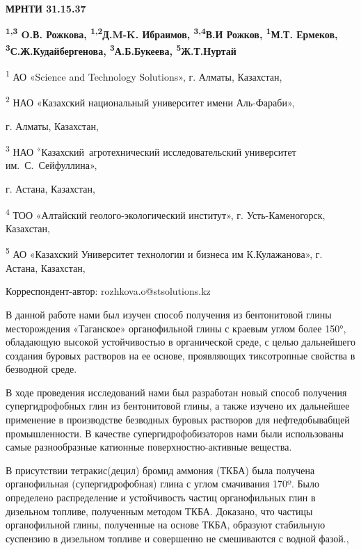 \newpage
{\bfseries МРНТИ 31.15.37}


\begin{center}
{\bfseries \textsuperscript{1,3} O.В. Рожкова, \textsuperscript{1,2}Д.M-K. Ибраимов, \textsuperscript{3,4}В.И Рожков, \textsuperscript{1}М.Т. Ермеков, \textsuperscript{3}С.Ж.Кудайбергенова, \textsuperscript{3}А.Б.Букеева, \textsuperscript{5}Ж.Т.Нуртай}

\textsuperscript{1} АО «Science and Technology Solutions», г. Алматы,
Казахстан,

\textsuperscript{2} НАО «Казахский национальный университет имени
Аль-Фараби»,

г. Алматы, Казахстан,

\textsuperscript{3} НАО \textsuperscript{«}Казахский~агротехнический
исследовательский университет им.~С.~Сейфуллина»,

г. Астана, Казахстан,

\textsuperscript{4} ТОО «Алтайский геолого-экологический институт», г.
Усть-Каменогорск, Казахстан,

\textsuperscript{5} АО «Казахский Университет технологии и бизнеса им
К.Кулажанова», г. Астана, Казахстан,

Корреспондент-автор: rozhkova.o@stsolutions.kz
\end{center}

В данной работе нами был изучен способ получения из бентонитовой глины
месторождения «Таганское» органофильной глины с краевым углом более
150°, обладающую высокой устойчивостью в органической среде, с целью
дальнейшего создания буровых растворов на ее основе, проявляющих
тиксотропные свойства в безводной среде.

В ходе проведения исследований нами был разработан новый способ
получения супергидрофобных глин из бентонитовой глины, а также изучено
их дальнейшее применение в производстве безводных буровых растворов для
нефтедобывабщей промышленности. В качестве супергидрофобизаторов нами
были использованы самые разнообразные катионные поверхностно-активные
вещества.

В присутствии тетракис(децил) бромид аммония (ТКБА) была получена
органофильная (супергидрофобная) глина с углом смачивания 170º. Было
определено распределение и устойчивость частиц органофильных глин в
дизельном топливе, полученным методом ТКБА. Доказано, что частицы
органофильной глины, полученные на основе ТКБА, образуют стабильную
суспензию в дизельном топливе и совершенно не смешиваются с водной
фазой.,

